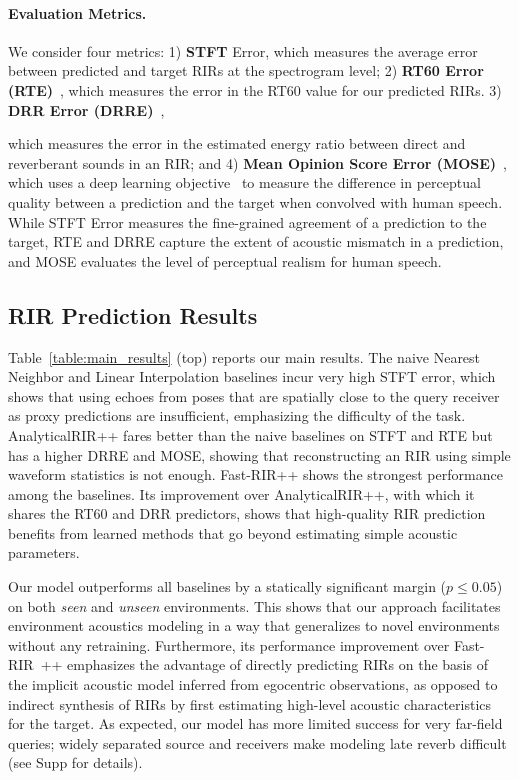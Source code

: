 \paragraph{Evaluation Metrics.} We consider four metrics: 1) \textbf{STFT} Error, which measures the average error between predicted and target RIRs at the spectrogram level; 2) \textbf{RT60 Error (RTE)}~\citep{singh2021image2reverb, ratnarajah2021ts, ratnarajah2022fast}, which measures the error in the RT60 value for our predicted RIRs. 3) \textbf{DRR Error (DRRE)}~\citep{ratnarajah2021ts}, 

which measures the error in the estimated energy ratio between direct and reverberant sounds in an RIR; and 4) \textbf{Mean Opinion Score Error (MOSE)}~\citep{chen2022visual}, which uses a deep learning objective~\citep{mosnet} to measure the difference in perceptual quality between a prediction and the target when convolved with human speech. While STFT Error measures the fine-grained agreement of a prediction to the target, RTE and DRRE capture the extent of acoustic mismatch in a prediction, and MOSE evaluates the level of perceptual realism for human speech. 

\subsection{RIR Prediction Results}\label{sec:eval_main}

Table~\ref{table:main_results} (top) reports our main results. The naive Nearest Neighbor and Linear Interpolation baselines incur very high STFT error, which shows that using echoes from poses that are spatially close to the query receiver as proxy predictions are insufficient, emphasizing the difficulty of the task. AnalyticalRIR++ fares better than the naive baselines on STFT and RTE but has a higher DRRE and MOSE, showing that reconstructing an RIR using simple waveform statistics is not enough. Fast-RIR++ shows the strongest performance among the baselines. Its improvement over AnalyticalRIR++, with which it shares the RT60 and DRR predictors, shows that high-quality RIR prediction benefits from learned methods that go beyond estimating simple acoustic parameters.

Our model outperforms all baselines by a statically significant margin ($p \leq 0.05$) on both \emph{seen} and \emph{unseen} environments. This shows that our approach facilitates environment acoustics modeling in a way that generalizes to novel environments without any retraining. Furthermore, its performance improvement over Fast-RIR~\citep{ratnarajah2022fast}++ emphasizes the advantage of directly predicting RIRs on the basis of the implicit acoustic model inferred from egocentric observations, as opposed to indirect synthesis of RIRs by first estimating high-level acoustic characteristics for the target. As expected, our model has more limited success for very far-field queries; widely separated source and receivers make modeling late reverb difficult (see Supp for details).

